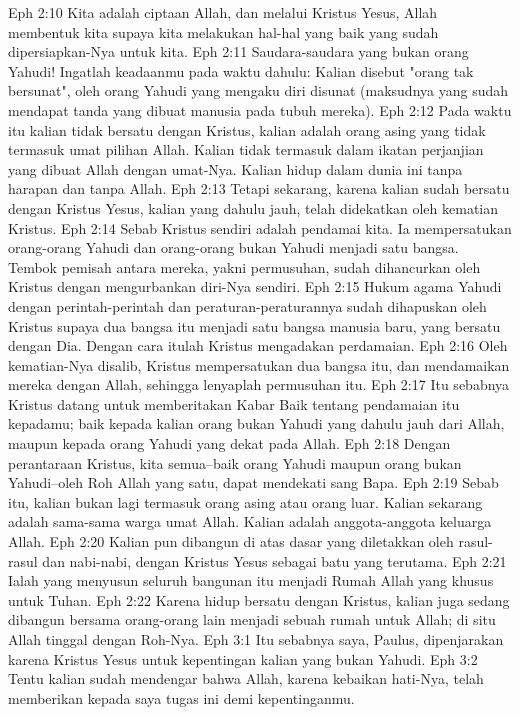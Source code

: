 Eph 2:10  Kita adalah ciptaan Allah, dan melalui Kristus Yesus, Allah membentuk kita supaya kita melakukan hal-hal yang baik yang sudah dipersiapkan-Nya untuk kita.
Eph 2:11  Saudara-saudara yang bukan orang Yahudi! Ingatlah keadaanmu pada waktu dahulu: Kalian disebut "orang tak bersunat", oleh orang Yahudi yang mengaku diri disunat (maksudnya yang sudah mendapat tanda yang dibuat manusia pada tubuh mereka).
Eph 2:12  Pada waktu itu kalian tidak bersatu dengan Kristus, kalian adalah orang asing yang tidak termasuk umat pilihan Allah. Kalian tidak termasuk dalam ikatan perjanjian yang dibuat Allah dengan umat-Nya. Kalian hidup dalam dunia ini tanpa harapan dan tanpa Allah.
Eph 2:13  Tetapi sekarang, karena kalian sudah bersatu dengan Kristus Yesus, kalian yang dahulu jauh, telah didekatkan oleh kematian Kristus.
Eph 2:14  Sebab Kristus sendiri adalah pendamai kita. Ia mempersatukan orang-orang Yahudi dan orang-orang bukan Yahudi menjadi satu bangsa. Tembok pemisah antara mereka, yakni permusuhan, sudah dihancurkan oleh Kristus dengan mengurbankan diri-Nya sendiri.
Eph 2:15  Hukum agama Yahudi dengan perintah-perintah dan peraturan-peraturannya sudah dihapuskan oleh Kristus supaya dua bangsa itu menjadi satu bangsa manusia baru, yang bersatu dengan Dia. Dengan cara itulah Kristus mengadakan perdamaian.
Eph 2:16  Oleh kematian-Nya disalib, Kristus mempersatukan dua bangsa itu, dan mendamaikan mereka dengan Allah, sehingga lenyaplah permusuhan itu.
Eph 2:17  Itu sebabnya Kristus datang untuk memberitakan Kabar Baik tentang pendamaian itu kepadamu; baik kepada kalian orang bukan Yahudi yang dahulu jauh dari Allah, maupun kepada orang Yahudi yang dekat pada Allah.
Eph 2:18  Dengan perantaraan Kristus, kita semua--baik orang Yahudi maupun orang bukan Yahudi--oleh Roh Allah yang satu, dapat mendekati sang Bapa.
Eph 2:19  Sebab itu, kalian bukan lagi termasuk orang asing atau orang luar. Kalian sekarang adalah sama-sama warga umat Allah. Kalian adalah anggota-anggota keluarga Allah.
Eph 2:20  Kalian pun dibangun di atas dasar yang diletakkan oleh rasul-rasul dan nabi-nabi, dengan Kristus Yesus sebagai batu yang terutama.
Eph 2:21  Ialah yang menyusun seluruh bangunan itu menjadi Rumah Allah yang khusus untuk Tuhan.
Eph 2:22  Karena hidup bersatu dengan Kristus, kalian juga sedang dibangun bersama orang-orang lain menjadi sebuah rumah untuk Allah; di situ Allah tinggal dengan Roh-Nya.
Eph 3:1  Itu sebabnya saya, Paulus, dipenjarakan karena Kristus Yesus untuk kepentingan kalian yang bukan Yahudi.
Eph 3:2  Tentu kalian sudah mendengar bahwa Allah, karena kebaikan hati-Nya, telah memberikan kepada saya tugas ini demi kepentinganmu.
